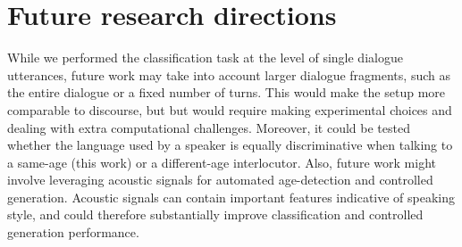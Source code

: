 
\section{Future research directions}

While we performed the classification task at the level of single dialogue utterances, future work may take into account larger dialogue fragments, such as the entire dialogue or a fixed number of turns. This would make the setup more comparable to discourse, but but would require making experimental choices and dealing with extra computational challenges. Moreover, it could be tested whether the language used by a speaker is equally discriminative when talking to a same-age (this work) or a different-age interlocutor. Also, future work might involve leveraging acoustic signals for automated age-detection and controlled generation. Acoustic signals can contain important features indicative of speaking style, and could therefore substantially improve classification and controlled generation performance.

